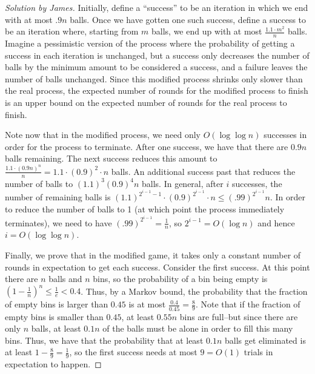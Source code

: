 \documentclass{article}
\newenvironment{solution}[1]{\begin{proof}[Solution by #1]}{\end{proof}}
\begin{document}
\begin{solution}{James}
    Initially, define a ``success'' to be an iteration in which we end with at most $.9n$ balls.  Once we have gotten one such success, define a success to be an iteration where, starting from $m$ balls, we end up with at most $\frac{1.1 \cdot m^2}{n}$ balls.  Imagine a pessimistic version of the process where the probability of getting a success in each iteration is unchanged, but a success only decreases the number of balls by the minimum amount to be considered a success, and a failure leaves the number of balls unchanged.  Since this modified process shrinks only slower than the real process, the expected number of rounds for the modified process to finish is an upper bound on the expected number of rounds for the real process to finish.
    
    Note now that in the modified process, we need only $O(\log \log n)$ successes in order for the process to terminate.  After one success, we have that there are $0.9n$ balls remaining.  The next success reduces this amount to $\frac{1.1 \cdot (0.9n)^n}{n} = 1.1 \cdot (0.9)^2 \cdot n$ balls.  An additional success past that reduces the number of balls to $(1.1)^3 (0.9)^4 n$ balls.  In general, after $i$ successes, the number of remaining balls is $(1.1)^{2^{i - 1} - 1} \cdot (0.9)^{2^{i - 1}} \cdot n \leq (.99)^{2^{i - 1}} n$.  In order to reduce the number of balls to 1 (at which point the process immediately terminates), we need to have $(.99)^{2^{i - 1}} = \frac{1}{n}$, so $2^{i - 1} = O(\log n)$ and hence $i = O(\log \log n)$.
    
    Finally, we prove that in the modified game, it takes only a constant number of rounds in expectation to get each success.  Consider the first success.  At this point there are $n$ balls and $n$ bins, so the probability of a bin being empty is $(1 - \frac{1}{n})^n \leq \frac{1}{e} < 0.4$.  Thus, by a Markov bound, the probability that the fraction of empty bins is larger than $0.45$ is at most $\frac{0.4}{0.45} = \frac{8}{9}$.  Note that if the fraction of empty bins is smaller than $0.45$, at least $0.55n$ bins are full--but since there are only $n$ balls, at least $0.1n$ of the balls must be alone in order to fill this many bins.  Thus, we have that the probability that at least $0.1n$ balls get eliminated is at least $1 - \frac{8}{9} = \frac{1}{9}$, so the first success needs at most $9 = O(1)$ trials in expectation to happen.
    

\end{solution}
\end{document}
